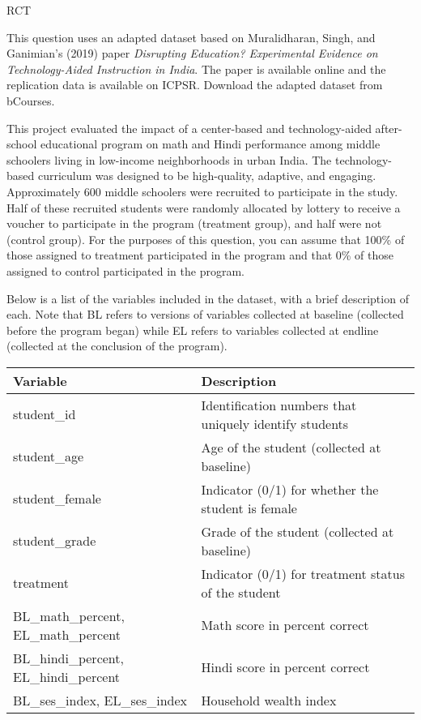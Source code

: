 \begin{homeworkProblem}{RCT}

    This question uses an adapted dataset based on Muralidharan, Singh, and 
    Ganimian’s (2019) paper \textit{Disrupting Education? Experimental 
    Evidence on Technology-Aided Instruction in India}. The paper is available 
    online and the replication data is available on ICPSR. Download the 
    adapted dataset from bCourses.

    This project evaluated the impact of a center-based and technology-aided 
    after-school educational program on math and Hindi performance among middle
    schoolers living in low-income neighborhoods in urban India. The 
    technology-based curriculum was designed to be high-quality, adaptive, 
    and engaging. Approximately 600 middle schoolers were recruited to 
    participate in the study. Half of these recruited students were randomly
    allocated by lottery to receive a voucher to participate in the program 
    (treatment group), and half were not (control group). For the purposes of 
    this question, you can assume that 100\% of those assigned to treatment 
    participated in the program and that 0\% of those assigned to control 
    participated in the program.

    Below is a list of the variables included in the dataset, with a brief 
    description of each. Note that BL refers to versions of variables 
    collected at baseline (collected before the program began) while EL refers 
    to variables collected at endline (collected at the conclusion of the 
    program).

    \begin{table}[h!]
        \centering
        \begin{tabular}{ll}
            \toprule
            \textbf{Variable} & \textbf{Description} \\
            \midrule
            student\_id & Identification numbers that uniquely identify students \\
            student\_age & Age of the student (collected at baseline) \\
            student\_female & Indicator (0/1) for whether the student is female \\
            student\_grade & Grade of the student (collected at baseline) \\
            treatment & Indicator (0/1) for treatment status of the student \\
            BL\_math\_percent, EL\_math\_percent & Math score in percent correct \\
            BL\_hindi\_percent, EL\_hindi\_percent & Hindi score in percent correct \\
            BL\_ses\_index, EL\_ses\_index & Household wealth index \\
            \bottomrule
        \end{tabular}
    \end{table}


\end{homeworkProblem}
